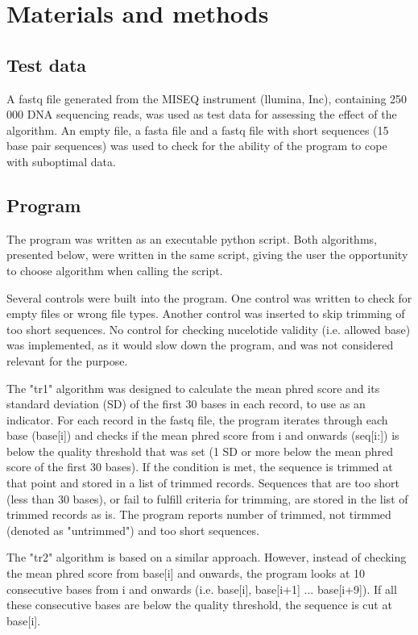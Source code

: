 \documentclass[10pt,letterpaper]{article}
\begin{document}
\section*{Materials and methods}
\subsection*{Test data}
A fastq file generated from the MISEQ instrument (llumina, Inc), containing 250 000 DNA sequencing reads, was used as test data for assessing the effect of the algorithm. An empty file, a fasta file and a fastq file with short sequences (15 base pair sequences) was used to check for the ability of the program to cope with suboptimal data.

\subsection*{Program}
The program was written as an executable python script. Both algorithms, presented below, were written in the same script, giving the user the opportunity to choose algorithm when calling the script.

Several controls were built into the program. One control was written to check for empty files or wrong file types. Another control was inserted to skip trimming of too short sequences. No control for checking nucelotide validity (i.e. allowed base) was implemented, as it would slow down the program, and was not considered relevant for the purpose.

The "tr1" algorithm was designed to calculate the mean phred score and its standard deviation (SD) of the first 30 bases in each record, to use as an indicator. For each record in the fastq file, the program iterates through each base (base[i]) and checks if the mean phred score from i and onwards (seq[i:]) is below the quality threshold that was set (1 SD or more below the mean phred score of the first 30 bases). If the condition is met, the sequence is trimmed at that point and stored in a list of trimmed records. Sequences that are too short (less than 30 bases), or fail to fulfill criteria for trimming, are stored in the list of trimmed records as is. The program reports number of trimmed, not tirmmed (denoted as "untrimmed") and too short sequences.

The "tr2" algorithm is based on a similar approach. However, instead of checking the mean phred score from base[i]  and onwards, the program looks at 10 consecutive bases from i and onwards (i.e. base[i], base[i+1] ... base[i+9]). If all these consecutive bases are below the quality threshold, the sequence is cut at base[i].
\end{document}
